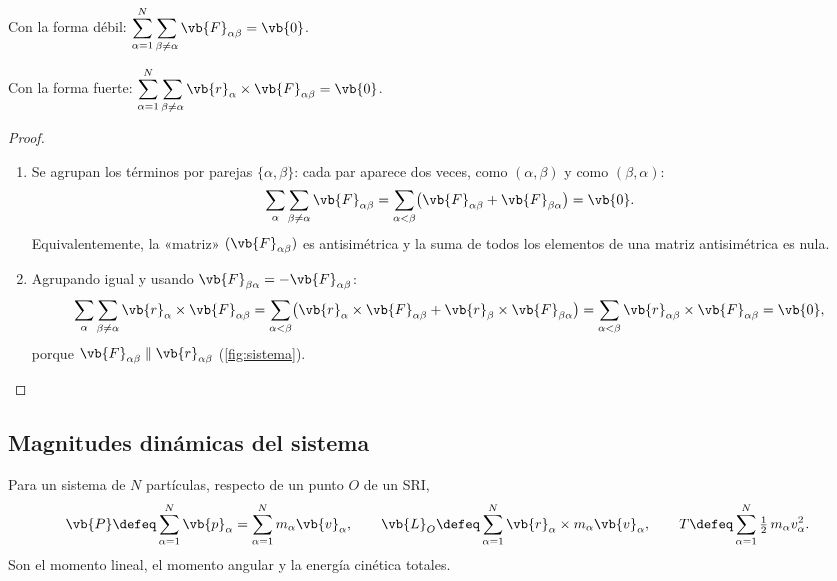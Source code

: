 \begin{lema}
\label{lem:internas}
\begin{casos}
  \item Con la forma débil: $\displaystyle\sa\sum_{\beta\neq\alpha}\vb{F}_{\alpha\beta}=\vb{0}$.
  \item Con la forma fuerte: $\displaystyle\sa\sum_{\beta\neq\alpha}\vb{r}_{\alpha}\times\vb{F}_{\alpha\beta}=\vb{0}$.
\end{casos}
\end{lema}

\begin{proof}
\begin{enumerate}
  \item Se agrupan los términos por parejas $\{\alpha,\beta\}$: cada par aparece
  dos veces, como $(\alpha,\beta)$ y como $(\beta,\alpha)$:
  \[
    \sum_{\alpha}\sum_{\beta\neq\alpha}\vb{F}_{\alpha\beta}=\sab\bigl(\vb{F}_{\alpha\beta}+\vb{F}_{\beta\alpha}\bigr)=\vb{0}.
  \]
  Equivalentemente, la «matriz» $(\vb{F}_{\alpha\beta})$ es antisimétrica y la suma de
  todos los elementos de una matriz antisimétrica es nula.
  \item Agrupando igual y usando $\vb{F}_{\beta\alpha}=-\vb{F}_{\alpha\beta}$:
  \[
    \sum_{\alpha}\sum_{\beta\neq\alpha}\vb{r}_{\alpha}\times\vb{F}_{\alpha\beta}
    =\sab\bigl(\vb{r}_{\alpha}\times\vb{F}_{\alpha\beta}+\vb{r}_{\beta}\times\vb{F}_{\beta\alpha}\bigr)
    =\sab\vb{r}_{\alpha\beta}\times\vb{F}_{\alpha\beta}=\vb{0},
  \]
  porque $\vb{F}_{\alpha\beta}\parallel\vb{r}_{\alpha\beta}$ (\cref{fig:sistema}).\qedhere
\end{enumerate}
\end{proof}

\subsection{Magnitudes dinámicas del sistema}

\begin{definicion}
\label{def:magnitudes}
Para un sistema de $N$ partículas, respecto de un punto $O$ de un SRI,
\begin{equation}
  \vb{P}\defeq\sa\vb{p}_{\alpha}=\sa m_{\alpha}\vb{v}_{\alpha},\qquad
  \vb{L}_{O}\defeq\sa\vb{r}_{\alpha}\times m_{\alpha}\vb{v}_{\alpha},\qquad
  T\defeq\sa\tfrac12\,m_{\alpha}v_{\alpha}^{2}.
\end{equation}
Son el momento lineal, el momento angular y la energía cinética totales.
\end{definicion}
